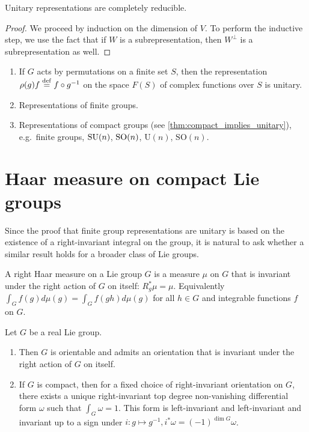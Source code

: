 \documentclass{report}
\begin{document}
\begin{theorem}\label{thm:unitary_implies_completeley_reducible}
    Unitary representations are completely reducible.
\end{theorem}
\begin{proof}
    We proceed by induction on the dimension of $V$.
    To perform the inductive step, we use the fact that if $W$ is a subrepresentation, then $W^\perp$ is a subrepresentation as well.
\end{proof}
\begin{example}
    \begin{enumerate}[label = (\roman*)]
        \item If $G$ acts by permutations on a finite set $S$, then the representation $\rho(g)f \overset{\mathrm{def}}{=} f \circ g^{-1}$ on the space $F(S)$ of complex functions over $S$ is unitary.
        \item Representations of finite groups.
        \item Representations of compact groups (see \cref{thm:compact_implies_unitary}), e.g.\ finite groups, $\operatorname{{\mathrm{SU}}}(n)$, $\operatorname{{\mathrm{SO}}}(n)$, $\mathrm{U}(n)$, $\mathrm{SO}(n)$.
    \end{enumerate}
\end{example}

\section{Haar measure on compact Lie groups}
Since the proof that finite group representations are unitary is based on the existence of a right-invariant integral on the group, it is natural to ask whether a similar result holds for a broader class of Lie groups.

\begin{definition}
    A right Haar measure on a Lie group $G$ is a measure $\mu$ on $G$ that is invariant under the right action of $G$ on itself: $R_g^* \mu = \mu$.
    Equivalently $\int_G f(g) d\mu(g) = \int_G f(gh) d\mu(g)$ for all $h \in G$ and integrable functions $f$ on $G$.
\end{definition}

\begin{theorem}
    Let $G$ be a real Lie group.
    \begin{enumerate}
        \item Then $G$ is orientable and admits an orientation that is invariant under the right action of $G$ on itself.
        \item If $G$ is compact, then for a fixed choice of right-invariant orientation on $G$, there exists a unique right-invariant top degree non-vanishing differential form $\omega$ such that $\int_G \omega = 1$.
        This form is left-invariant and left-invariant  and invariant up to a sign under $i: g 
    \mapsto g^{-1}, i^*\omega = (-1)^{\dim G} \omega$.
    \end{enumerate}
\end{theorem}
\end{document}
